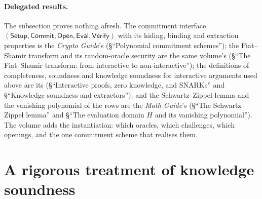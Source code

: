 \documentclass[11pt,a4paper]{article}
\theoremstyle{definition}
\newcommand{\Comm}{\mathsf{Commit}}
\newcommand{\Open}{\mathsf{Open}}
\newcommand{\Setup}{\mathsf{Setup}}
\newcommand{\Verify}{\mathsf{Verify}}
\begin{document}
\paragraph{Delegated results.}
The subsection proves nothing afresh. The commitment interface $(\Setup, \Comm,
\Open, \mathsf{Eval}, \Verify)$ with its hiding, binding and extraction
properties is the \emph{Crypto Guide}'s (\S``Polynomial commitment
schemes''); the Fiat--Shamir transform and its random-oracle security
are the same volume's (\S``The Fiat--Shamir transform: from interactive
to non-interactive''); the definitions of completeness, soundness and
knowledge soundness for interactive arguments used above are its
(\S``Interactive proofs, zero knowledge, and SNARKs'' and
\S``Knowledge soundness and extractors''); and the Schwartz--Zippel
lemma and the vanishing polynomial of the rows are the \emph{Math
Guide}'s (\S``The Schwartz--Zippel lemma'' and \S``The evaluation domain
$H$ and its vanishing polynomial''). The volume adds the instantiation:
which oracles, which challenges, which openings, and the one commitment
scheme that realises them.


\section{A rigorous treatment of knowledge soundness}
\label{sec:ks}
\end{document}
